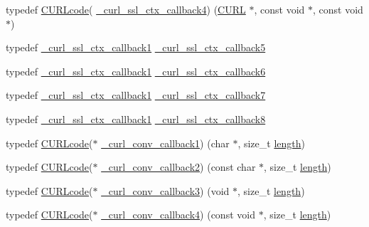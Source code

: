 \begin{DoxyCompactItemize}
\item 
typedef \hyperlink{curl_8h_af0691941698240652e0a391394217951}{C\+U\+R\+Lcode}( \hyperlink{typecheck-gcc_8h_a0347bde422908e03a70feec13cce7119}{\+\_\+curl\+\_\+ssl\+\_\+ctx\+\_\+callback4}) (\hyperlink{curl_8h_ace655e3633b6533591283994d6b5cdda}{C\+U\+RL} $\ast$, const void $\ast$, const void $\ast$)
\item 
typedef \hyperlink{typecheck-gcc_8h_a05c55b1e4b35247bffa0fbe08d41ad38}{\+\_\+curl\+\_\+ssl\+\_\+ctx\+\_\+callback1} \hyperlink{typecheck-gcc_8h_ab603023e8514bafb4f44a5f7830beda0}{\+\_\+curl\+\_\+ssl\+\_\+ctx\+\_\+callback5}
\item 
typedef \hyperlink{typecheck-gcc_8h_a05c55b1e4b35247bffa0fbe08d41ad38}{\+\_\+curl\+\_\+ssl\+\_\+ctx\+\_\+callback1} \hyperlink{typecheck-gcc_8h_a6c4618e2a8fc4dac60df619ad8679b5a}{\+\_\+curl\+\_\+ssl\+\_\+ctx\+\_\+callback6}
\item 
typedef \hyperlink{typecheck-gcc_8h_a05c55b1e4b35247bffa0fbe08d41ad38}{\+\_\+curl\+\_\+ssl\+\_\+ctx\+\_\+callback1} \hyperlink{typecheck-gcc_8h_ae2ebdce539e2b1b1348bca8c74831d86}{\+\_\+curl\+\_\+ssl\+\_\+ctx\+\_\+callback7}
\item 
typedef \hyperlink{typecheck-gcc_8h_a05c55b1e4b35247bffa0fbe08d41ad38}{\+\_\+curl\+\_\+ssl\+\_\+ctx\+\_\+callback1} \hyperlink{typecheck-gcc_8h_aeea9c5ad63d27b7ce77216a872b737c6}{\+\_\+curl\+\_\+ssl\+\_\+ctx\+\_\+callback8}
\item 
typedef \hyperlink{curl_8h_af0691941698240652e0a391394217951}{C\+U\+R\+Lcode}($\ast$ \hyperlink{typecheck-gcc_8h_ae23e3d9711c086a0e6d7ed71528af612}{\+\_\+curl\+\_\+conv\+\_\+callback1}) (char $\ast$, size\+\_\+t \hyperlink{asn1_8h_a5a2d57a92488e64c730cabc247c9d5b5}{length})
\item 
typedef \hyperlink{curl_8h_af0691941698240652e0a391394217951}{C\+U\+R\+Lcode}($\ast$ \hyperlink{typecheck-gcc_8h_a0fea29cfe79074a01e621e1a60991ef5}{\+\_\+curl\+\_\+conv\+\_\+callback2}) (const char $\ast$, size\+\_\+t \hyperlink{asn1_8h_a5a2d57a92488e64c730cabc247c9d5b5}{length})
\item 
typedef \hyperlink{curl_8h_af0691941698240652e0a391394217951}{C\+U\+R\+Lcode}($\ast$ \hyperlink{typecheck-gcc_8h_a860c9f69cd61f0d62fe6d1c07f997557}{\+\_\+curl\+\_\+conv\+\_\+callback3}) (void $\ast$, size\+\_\+t \hyperlink{asn1_8h_a5a2d57a92488e64c730cabc247c9d5b5}{length})
\item 
typedef \hyperlink{curl_8h_af0691941698240652e0a391394217951}{C\+U\+R\+Lcode}($\ast$ \hyperlink{typecheck-gcc_8h_ac3b116e3ba589ed78cc87e7c3112ea3a}{\+\_\+curl\+\_\+conv\+\_\+callback4}) (const void $\ast$, size\+\_\+t \hyperlink{asn1_8h_a5a2d57a92488e64c730cabc247c9d5b5}{length})

\end{DoxyCompactItemize}
